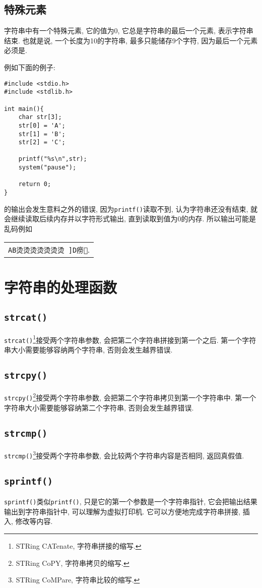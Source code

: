         \subsection*{特殊元素}
            字符串中有一个特殊元素\texttt{}, 它的值为0, 它总是字符串的最后一个元素, 表示字符串结束. 也就是说, 一个长度为10的字符串, 最多只能储存9个字符, 因为最后一个元素必须是\texttt{}.

            例如下面的例子:
\begin{lstlisting}
#include <stdio.h>
#include <stdlib.h>

int main(){
    char str[3];
    str[0] = 'A';
    str[1] = 'B';
    str[2] = 'C';

    printf("%s\n",str);
    system("pause");

    return 0;
}
\end{lstlisting}
            的输出会发生意料之外的错误, 因为\texttt{printf()}读取不到\texttt{}, 认为字符串还没有结束, 就会继续读取后续内存并以字符形式输出, 直到读取到值为0的内存. 所以输出可能是乱码例如
            \begin{center}
            \begin{longtable}{l}
                \texttt{AB烫烫烫烫烫烫烫 ]D痨}.
            \end{longtable}
            \end{center}

    \section{字符串的处理函数}
        \subsection*{\texttt{strcat()}}
            \texttt{strcat()}\footnote{STRing CATenate, 字符串拼接的缩写.}接受两个字符串参数, 会把第二个字符串拼接到第一个之后. 第一个字符串大小需要能够容纳两个字符串, 否则会发生越界错误.

        \subsection*{\texttt{strcpy()}}
            \texttt{strcpy()}\footnote{STRing CoPY, 字符串拷贝的缩写.}接受两个字符串参数, 会把第二个字符串拷贝到第一个字符串中. 第一个字符串大小需要能够容纳第二个字符串, 否则会发生越界错误.

        \subsection*{\texttt{strcmp()}}
            \texttt{strcmp()}\footnote{STRing CoMPare, 字符串比较的缩写.}接受两个字符串参数, 会比较两个字符串内容是否相同, 返回真假值.

        \subsection*{\texttt{sprintf()}}
            \texttt{sprintf()}类似\texttt{printf()}, 只是它的第一个参数是一个字符串指针, 它会把输出结果输出到字符串指针中, 可以理解为虚拟打印机. 它可以方便地完成字符串拼接, 插入, 修改等内容.